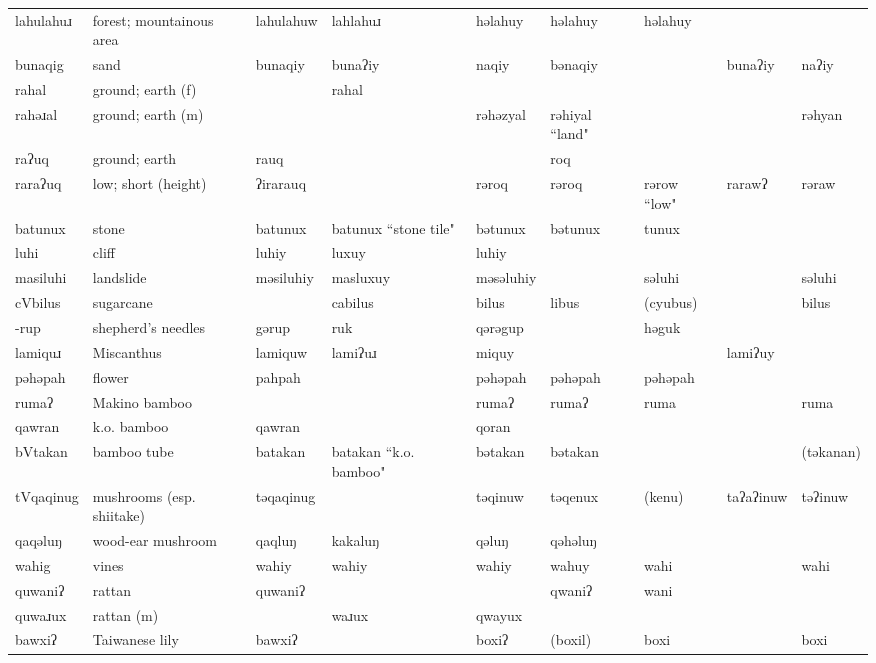 \begin{landscape}
\begin{longtable}{*{9}{>{\raggedright\arraybackslash}p{}}}
\text{*}lahulahuɹ & forest; mountainous area & lahulahuw & lahlahuɹ & həlahuy & həlahuy & həlahuy &  & \\
\text{*}bunaqig & sand & bunaqiy & bunaʔiy & naqiy & bənaqiy &  & bunaʔiy & naʔiy\\
\text{*}rahal & ground; earth (f) &  & rahal &  &  &  &  & \\
\text{*}rahəɹal & ground; earth (m) &  &  & rəhəzyal & rəhiyal ``land" &  &  & rəhyan\\
\text{*}raʔuq & ground; earth & rauq &  &  & roq &  &  & \\
\text{*}raraʔuq & low; short (height) & ʔirarauq &  & rəroq & rəroq & rərow ``low" & rarawʔ & rəraw\\
\text{*}batunux & stone & batunux & batunux ``stone tile" & bətunux & bətunux & tunux &  & \\
\text{*}luhi & cliff & luhiy & luxuy & luhiy &  &  &  & \\
\text{*}masiluhi & landslide & məsiluhiy & masluxuy & məsəluhiy &  & səluhi &  & səluhi\\
\text{*}cVbilus & sugarcane &  & cabilus & bilus & libus & (cyubus) &  & bilus\\
\text{*}-rup & shepherd's needles & gərup & ruk & qərəgup &  & həguk &  & \\
\text{*}lamiquɹ & Miscanthus & lamiquw & lamiʔuɹ & miquy &  &  & lamiʔuy & \\
\text{*}pəhəpah & flower & pahpah &  & pəhəpah & pəhəpah & pəhəpah &  & \\
\text{*}rumaʔ & Makino bamboo &  &  & rumaʔ & rumaʔ & ruma &  & ruma\\
\text{*}qawran & k.o. bamboo & qawran &  & qoran &  &  &  & \\
\text{*}bVtakan & bamboo tube & batakan & batakan \newline ``k.o. bamboo" & bətakan & bətakan &  &  & (təkanan)\\
\text{*}tVqaqinug & mushrooms (esp. shiitake) & təqaqinug &  & təqinuw & təqenux & (kenu) & taʔaʔinuw & təʔinuw\\
\text{*}qaqəluŋ & wood-ear mushroom & qaqluŋ & kakaluŋ & qəluŋ & qəhəluŋ &  &  & \\
\text{*}wahig & vines & wahiy & wahiy & wahiy & wahuy & wahi &  & wahi\\
\text{*}quwaniʔ & rattan & quwaniʔ &  &  & qwaniʔ & wani &  & \\
\text{*}quwaɹux & rattan (m) &  & waɹux & qwayux &  &  &  & \\
\text{*}bawxiʔ & Taiwanese lily & bawxiʔ &  & boxiʔ & (boxil) & boxi &  & boxi\\

\end{longtable}
\end{landscape}
